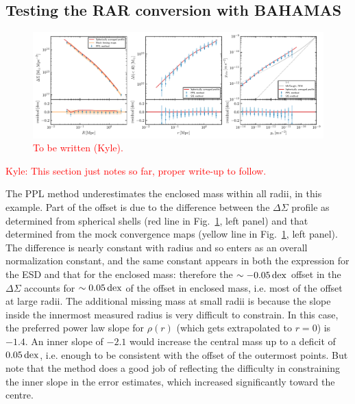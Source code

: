 \documentclass[usenatbib]{mnras}
\newcommand{\dex}{\, {\rm dex}}
\begin{document}
\subsection{Testing the RAR conversion with BAHAMAS}
\label{sec:conversion_test}

\begin{figure}
	\includegraphics[width=\textwidth]{Figures/compare_method}
	\caption{\textcolor{red}{To be written (Kyle).}}
	\label{fig:compare_method}
\end{figure}

\textcolor{Red}{Kyle: This section just notes so far, proper write-up to follow.}

The PPL method underestimates the enclosed mass within all radii, in this example. Part of the offset is due to the difference between the $\Delta\Sigma$ profile as determined from spherical shells (red line in Fig.~\ref{fig:compare_method}, left panel) and that determined from the mock convergence maps (yellow line in Fig.~\ref{fig:compare_method}, left panel). The difference is nearly constant with radius and so enters as an overall normalization constant, and the same constant appears in both the expression for the ESD and that for the enclosed mass: therefore the $\sim-0.05 \dex$ offset in the $\Delta\Sigma$ accounts for $\sim0.05 \dex$ of the offset in enclosed mass, i.e. most of the offset at large radii. The additional missing mass at small radii is because the slope inside the innermost measured radius is very difficult to constrain. In this case, the preferred power law slope for $\rho(r)$ (which gets extrapolated to $r=0$) is $-1.4$. An inner slope of $-2.1$ would increase the central mass up to a deficit of $0.05 \dex$, i.e. enough to be consistent with the offset of the outermost points. But note that the method does a good job of reflecting the difficulty in constraining the inner slope in the error estimates, which increased significantly toward the centre.
\end{document}
